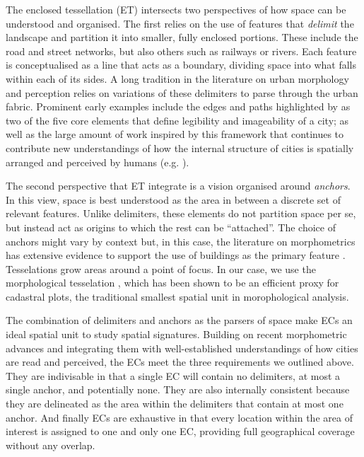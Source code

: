 The enclosed tessellation (ET) intersects two perspectives of how space can be understood and organised.
%
The first relies on the use of features that \textit{delimit} the landscape
and partition it into smaller, fully enclosed portions. These include the
road and street networks, but also others such as railways or rivers. Each
feature is conceptualised as a line that acts as a boundary, dividing space
into what falls within each of its sides.
%
A long tradition in the literature on urban morphology and perception
relies on variations of these delimiters to parse through the urban
fabric. Prominent early examples include the edges and paths highlighted by
\cite{lynch1960} as two of the five core elements that define legibility and
imageability of a city; as well as the large amount of work inspired by this
framework that continues to contribute new understandings of how the internal
structure of cities is spatially arranged and perceived by humans (e.g.
\citealp{filomena2019a}).

The second perspective that ET integrate is a vision organised
around \textit{anchors}. In this view, space is best understood as the area in
between a discrete set of relevant features. Unlike delimiters, these elements
do not partition space per se, but instead act as origins to which the rest
can be ``attached''.
%
The choice of anchors might vary by context but, in this case, the literature
on morphometrics has extensive evidence to support the use of buildings as
the primary feature \citep{hamaina2012a, usui2013estimation, schirmer2015}.
%
Tesselations grow areas around a point of focus. In our case, we use the
morphological tesselation \citep{fleischmann2020morphological}, which has been
shown to be an efficient proxy for cadastral plots, the traditional smallest spatial unit in
morophological analysis.


The combination of delimiters and anchors as the parsers of space make ECs an
ideal spatial unit to study spatial signatures.
%
Building on recent morphometric advances and integrating them with
well-established understandings of how cities are read and perceived, the ECs
meet the three requirements we outlined above.
%
They are indivisable in that a single EC will contain no delimiters, at
most a single anchor, and potentially none.
%
They are also internally consistent because they are delineated as the area
within the delimiters that contain at most one anchor.
%
And finally ECs are exhaustive in that every location within the area of
interest is assigned to one and only one EC, providing full geographical
coverage without any overlap.

